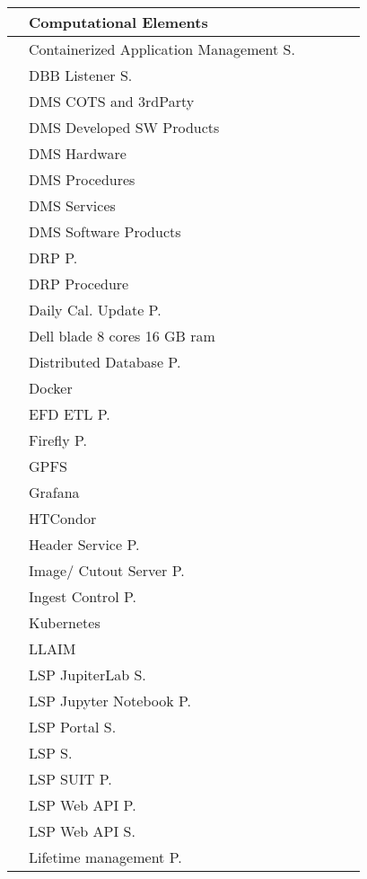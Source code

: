 \begin{longtable}{|p{}|p{}|p{}|p{}|p{}|p{}|}
 &  Computational Elements &  &  &  & \\ \hline
 &  Containerized Application Management S. &  &  &  & \\ \hline
 &  DBB Listener S. &  &  &  & \\ \hline
 &  DMS COTS and 3rdParty &  &  &  & \\ \hline
 &  DMS Developed SW Products &  &  &  & \\ \hline
 &  DMS Hardware &  &  &  & \\ \hline
 &  DMS Procedures &  &  &  & \\ \hline
 &  DMS Services &  &  &  & \\ \hline
 &  DMS Software Products &  &  &  & \\ \hline
 &  DRP P. &  &  &  & \\ \hline
 &  DRP Procedure &  &  &  & \\ \hline
 &  Daily Cal. Update P. &  &  &  & \\ \hline
 &  Dell blade 8 cores 16 GB ram &  &  &  & \\ \hline
 &  Distributed Database P. &  &  &  & \\ \hline
 &  Docker &  &  &  & \\ \hline
 &  EFD ETL P. &  &  &  & \\ \hline
 &  Firefly P. &  &  &  & \\ \hline
 &  GPFS &  &  &  & \\ \hline
 &  Grafana &  &  &  & \\ \hline
 &  HTCondor &  &  &  & \\ \hline
 &  Header Service P. &  &  &  & \\ \hline
 &  Image/ Cutout Server P. &  &  &  & \\ \hline
 &  Ingest Control P. &  &  &  & \\ \hline
 &  Kubernetes &  &  &  & \\ \hline
 &  LLAIM &  &  &  & \\ \hline
 &  LSP JupiterLab S. &  &  &  & \\ \hline
 &  LSP Jupyter Notebook P. &  &  &  & \\ \hline
 &  LSP Portal S. &  &  &  & \\ \hline
 &  LSP S. &  &  &  & \\ \hline
 &  LSP SUIT P. &  &  &  & \\ \hline
 &  LSP Web API P. &  &  &  & \\ \hline
 &  LSP Web API S. &  &  &  & \\ \hline
 &  Lifetime management P. &  &  &  & \\ \hline

\end{longtable}
